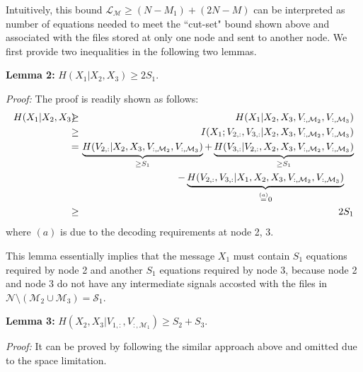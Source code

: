 \documentclass[conference]{IEEEtran}
\begin{document}
Intuitively, this bound $\mathcal{L}_{\mathcal{M}}\geq (N-M_1)+(2N-M)$ can be interpreted as number of equations needed to meet the ``cut-set" bound shown above and associated with the files stored at only one node and sent to another node. %
We first provide two inequalities in the following two lemmas.

{\bf Lemma 2:} $H(X_1|X_2,X_3)\geq 2S_1$.

{\it Proof:} The proof is readily shown as follows:
\begin{eqnarray}
H(X_1|X_2,X_3)&\!\!\!\!\geq\!\!\!\!& H(X_1|X_2,X_3,V_{:,\mathcal{M}_2},V_{:,\mathcal{M}_3})\label{eqn:bound4_decode2}\\
&\!\!\!\!\geq\!\!\!\!& I(X_1;V_{2,:},V_{3,:}|X_2,X_3,V_{:,\mathcal{M}_2},V_{:,\mathcal{M}_3})\\
&\!\!\!\!=\!\!\!\!& \underbrace{H(V_{2,:}|X_2,X_3,V_{:,\mathcal{M}_2},V_{:,\mathcal{M}_3})}_{\geq S_1}+\underbrace{H(V_{3,:}|V_{2,:},X_2,X_3,V_{:,\mathcal{M}_2},V_{:,\mathcal{M}_3})}_{\geq S_1}\notag\\
&\!\!\!\!\!\!\!\!&- \underbrace{H(V_{2,:},V_{3,:}|X_1,X_2,X_3,V_{:,\mathcal{M}_2},V_{:,\mathcal{M}_3})}_{\overset{(a)}{=}0}\ \ \ \\
&\!\!\!\!\geq\!\!\!\!& 2S_1
\end{eqnarray}
where $(a)$ is due to the decoding requirements at node 2, 3.

\begin{remark}
This lemma essentially implies that the message $X_1$ must contain $S_1$ equations required by node 2 and another $S_1$ equations required by node 3, because node 2 and node 3 do not have any intermediate signals accosted with the files in $\mathcal{N}\setminus (\mathcal{M}_2 \cup \mathcal{M}_3)=\mathcal{S}_1$.
\end{remark}

{\bf Lemma 3:} $H(X_2,X_3|V_{1,:},V_{:,\mathcal{M}_1})\geq S_2+S_3$.

{\it Proof:} It can be proved by following the similar approach above and omitted due to the space limitation.
\end{document}
